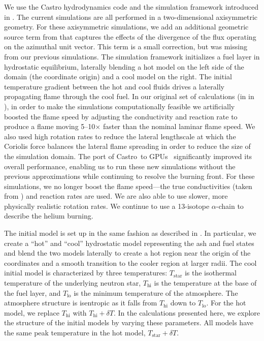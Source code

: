 \documentclass[preprint,times,tighten]{aastex63}
\newcommand{\castro}{{\sf Castro}}
\begin{document}
We use the Castro hydrodynamics code \citep{castro,castro_joss} and
the simulation framework introduced in \citet{flame_wave1}.  The
current simulations are all performed in a two-dimensional
axisymmetric geometry.  For these axisymmetric simulations, we add an
additional geometric source term from \citet{bernard-champmartin} that
captures the effects of the divergence of the flux operating on the
azimuthal unit vector.  This term is a small correction, but was
missing from our previous simulations.  The simulation framework
initializes a fuel layer in hydrostatic equilibrium, laterally
blending a hot model on the left side of the domain (the coordinate
origin) and a cool model on the right.  The initial temperature
gradient between the hot and cool fluids drives a laterally
propagating flame through the cool fuel.  In our original set of
calculations (in in \citet{flame_wave1}), in order to make the 
simulations computationally feasible we artificially boosted the flame speed by adjusting the
conductivity and reaction rate to produce a flame moving 5--10$\times$
faster than the nominal laminar flame speed.  We also used high
rotation rates to reduce the lateral lengthscale at which the Coriolis
force balances the lateral flame spreading in order to reduce the size 
of the simulation domain. The port of \castro\ to GPUs~\citep{sc20_gpu} 
significantly improved its overall performance, enabling
us to run these new simulations without the previous approximations while
continuing to resolve the burning front. For these
simulations, we no longer boost the flame speed---the true
conductivities (taken from \citealt{Timmes00}) and reaction rates are
used. We are also able to use slower, more physically realistic rotation rates.
  We continue to use a 13-isotope $\alpha$-chain to describe the
helium burning.  

The initial model is set up in the same fashion as described in
\citet{flame_wave1}.  In particular, we create a ``hot'' and ``cool''
hydrostatic model representing the ash and fuel states and blend the
two models laterally to create a hot region near the origin of the
coordinates and a smooth transition to the cooler region at larger
radii.  The cool initial model is characterized by three temperatures:
$T_\mathrm{star}$ is the isothermal temperature of the underlying
neutron star, $T_\mathrm{hi}$ is the temperature at the base of the
fuel layer, and $T_\mathrm{lo}$ is the minimum temperature of the
atmosphere. The atmosphere structure is isentropic as it falls from
$T_\mathrm{hi}$ down to $T_\mathrm{lo}$.  For the hot model, we
replace $T_\mathrm{hi}$ with $T_\mathrm{hi} + \delta T$.  In the
calculations presented here, we explore the structure of the initial
models by varying these parameters.  All models have the same
peak temperature in the hot model, $T_\mathrm{star} + \delta T$.
\end{document}
